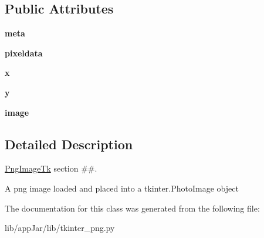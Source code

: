 \subsection*{Public Attributes}
\begin{DoxyCompactItemize}
\item 
\mbox{\label{classlib_1_1tkinter__png_1_1_png_image_tk_ad6493a4aa74f09b2062454f0fe4f4d0e}} 
{\bfseries meta}
\item 
\mbox{\label{classlib_1_1tkinter__png_1_1_png_image_tk_aad74c3b35a41f516fe69a07e57b98abf}} 
{\bfseries pixeldata}
\item 
\mbox{\label{classlib_1_1tkinter__png_1_1_png_image_tk_ac13326bc0049ac9cb7af7592dca842e1}} 
{\bfseries x}
\item 
\mbox{\label{classlib_1_1tkinter__png_1_1_png_image_tk_aa7d5dd955fc3bf769d2365291913eaf1}} 
{\bfseries y}
\item 
\mbox{\label{classlib_1_1tkinter__png_1_1_png_image_tk_a9fd6af81b92b1633ed520c9d85545f31}} 
{\bfseries image}
\end{DoxyCompactItemize}


\subsection{Detailed Description}
\hyperlink{classlib_1_1tkinter__png_1_1_png_image_tk}{Png\+Image\+Tk} section \#\#. 

\begin{DoxyVerb}A png image loaded and placed into a tkinter.PhotoImage object\end{DoxyVerb}
 

The documentation for this class was generated from the following file\+:\begin{DoxyCompactItemize}
\item 
lib/app\+Jar/lib/tkinter\+\_\+png.\+py\end{DoxyCompactItemize}
